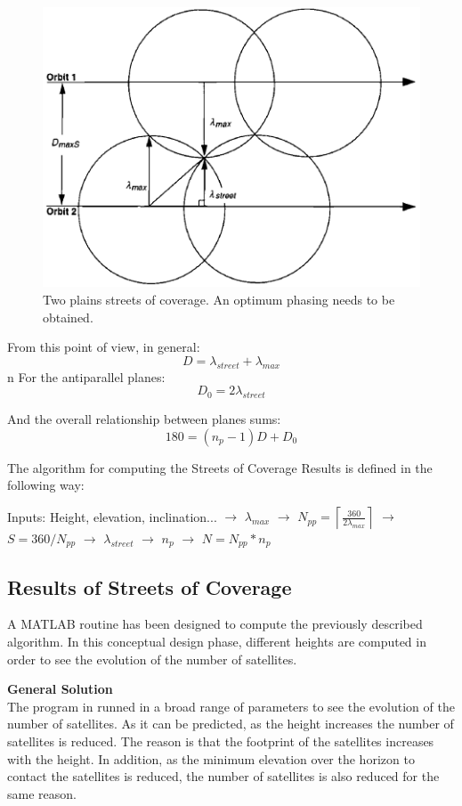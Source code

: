\begin{figure}[H]
\begin{center}
\includegraphics[scale=0.7]{PolarOrbits/planeseps.png}
\caption{Two plains streets of coverage. An optimum phasing needs to be obtained.\cite{ccar}}
\end{center}
\end{figure}

From this point of view, in general:
$$D = \lambda_{street} + \lambda_{max}$$
n
For the antiparallel planes:
$$D_{0} = 2\lambda_{street}$$

And the overall relationship between planes sums:
$$180 = (n_{p}-1)D + D_{0}$$

The algorithm for computing the Streets of Coverage Results is defined in the following way:

\begin{center}
Inputs: Height, elevation, inclination... 
$\rightarrow$
$\lambda_{max}$
$\rightarrow$
$N_{pp}=\left \lceil \frac{360}{2 \lambda_{max}}  \right \rceil$
$\rightarrow$
\newline
$S=360/N_{pp}$
$\rightarrow$
$\lambda_{street}$
$\rightarrow$
$n_{p}$
$\rightarrow$
$N=N_{pp}*n_{p}$
\end{center}

\newpage
\subsection{Results of Streets of Coverage}
A MATLAB routine has been designed to compute the previously described algorithm. In this conceptual design phase, different heights are computed in order to see the evolution of the number of satellites.

\textbf{General Solution}\\
The program in runned in a broad range of parameters to see the evolution of the number of satellites. As it can be predicted, as the height increases the number of satellites is reduced. The reason is that the footprint of the satellites increases with the height. In addition, as the minimum elevation over the horizon to contact the satellites is reduced, the number of satellites is also reduced for the same reason.

